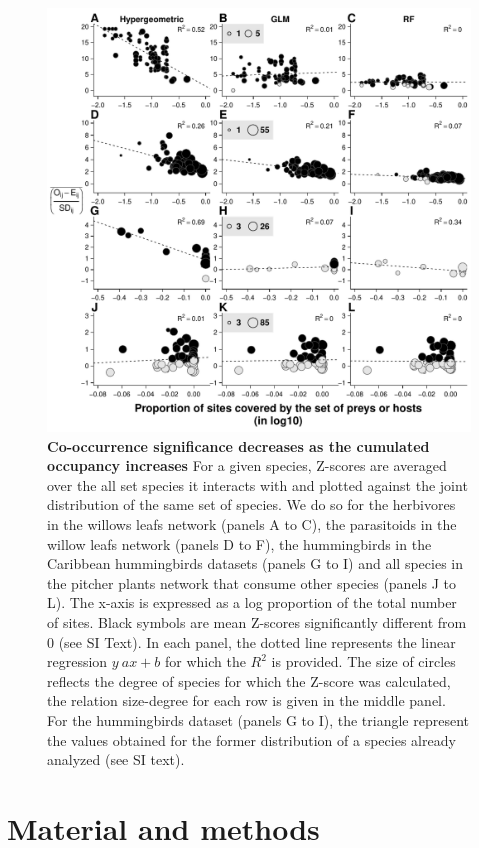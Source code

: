 \begin{figure}[htbp]
\centering
\includegraphics{chapitre3/figdegocc.pdf}
\caption{\textbf{Co-occurrence significance decreases as the cumulated
occupancy increases} For a given species, Z-scores are averaged over the
all set species it interacts with and plotted against the joint
distribution of the same set of species. We do so for the herbivores in
the willows leafs network (panels A to C), the parasitoids in the willow
leafs network (panels D to F), the hummingbirds in the Caribbean
hummingbirds datasets (panels G to I) and all species in the pitcher
plants network that consume other species (panels J to L). The x-axis is
expressed as a log proportion of the total number of sites. Black
symbols are mean Z-scores significantly different from 0 (see SI Text).
In each panel, the dotted line represents the linear regression
\(y~ax+b\) for which the \(R^2\) is provided. The size of circles
reflects the degree of species for which the Z-score was calculated, the
relation size-degree for each row is given in the middle panel. For the
hummingbirds dataset (panels G to I), the triangle represent the values
obtained for the former distribution of a species already analyzed (see
SI text).\label{fig:degocc}}
\end{figure}

\newpage
\section{Material and methods}\label{material-and-methods}

